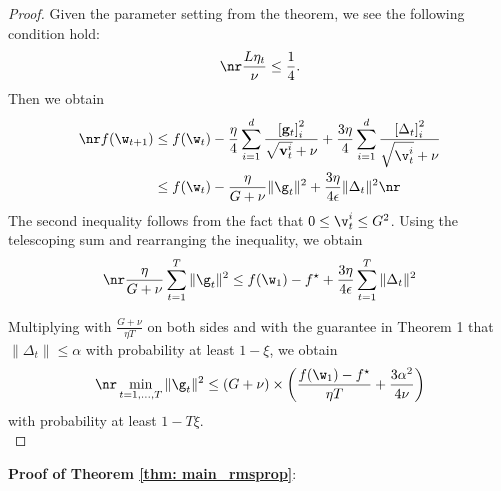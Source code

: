 \begin{proof}
Given the parameter setting from the theorem, we see the following condition hold:
\begin{equation} \nr
    \frac{L\eta_t}{\nu} \leq \frac{1}{4}.
\end{equation}
Then we obtain
\begin{align} 
\nr f(\w_{t+1})& \leq f(\w_t) - \frac{\eta}{4} \sum_{i=1}^{d} \frac{\left[\mathbf{g}_{t}\right]_{i}^{2}}{\sqrt{\mathbf{v}_{t}^{i}}+\nu}+\frac{3 \eta}{4} \sum_{i=1}^{d} \frac{\left[\Delta_{t}\right]_{i}^{2}}{\sqrt{\v_t^i} + \nu} \\ 
& \leq f(\w_t) - \frac{\eta}{G + \nu} \|\g_t\|^2 + \frac{3\eta}{4\epsilon} \|\Delta_t\|^2 \nr
\end{align}
The second inequality follows from the fact that $0 \leq \v_t^i \leq G^2$. Using the telescoping sum and rearranging the inequality,  we obtain
\begin{align} \nr
\frac{\eta}{G + \nu} \sum_{t=1}^T \|\g_t\|^2  \leq f(\w_1) - f^\star + \frac{3\eta}{4\epsilon} \sum_{t=1}^T  \|\Delta_t\|^2
\end{align}

Multiplying with $\frac{G +\nu}{\eta T}$ on both sides and with the guarantee in Theorem 1 that $\|\Delta_t\| \leq \alpha$ with probability at least $1-\xi$,  we obtain 
\begin{equation} \nr
\min_{t = 1,..., T}\|\g_t\|^2 \leq \left(G+\nu \right) \times \left(   \frac{ f(\w_1) - f^\star}{\eta T} + \frac{3 \alpha^2}{4\nu}\right)
\end{equation}
with probability at least $1-T\xi$.\\


\end{proof}

\vspace{0.1in}

\textbf{Proof of Theorem \ref{thm: main_rmsprop}}:

